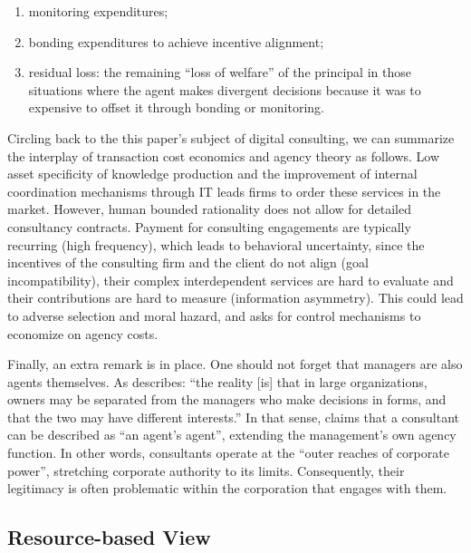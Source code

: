 \documentclass[12pt]{article}
\providecommand{\tightlist}{%
  \setlength{\itemsep}{0pt}\setlength{\parskip}{0pt}}
\begin{document}
\begin{enumerate}
\def\labelenumi{\arabic{enumi}.}
\tightlist
\item
  monitoring expenditures;
\item
  bonding expenditures to achieve incentive alignment;
\item
  residual loss: the remaining ``loss of welfare'' of the principal in
  those situations where the agent makes divergent decisions because it
  was to expensive to offset it through bonding or monitoring.
\end{enumerate}

Circling back to the this paper's subject of digital consulting, we can
summarize the interplay of transaction cost economics and agency theory
as follows. Low asset specificity of knowledge production and the
improvement of internal coordination mechanisms through IT leads firms
to order these services in the market. However, human bounded
rationality does not allow for detailed consultancy contracts. Payment
for consulting engagements are typically recurring (high frequency),
which leads to behavioral uncertainty, since the incentives of the
consulting firm and the client do not align (goal incompatibility),
their complex interdependent services are hard to evaluate and their
contributions are hard to measure (information asymmetry). This could
lead to adverse selection and moral hazard, and asks for control
mechanisms to economize on agency costs.

Finally, an extra remark is in place. One should not forget that
managers are also agents themselves. As \citet[584]{tosi1997} describes:
``the reality {[}is{]} that in large organizations, owners may be
separated from the managers who make decisions in forms, and that the
two may have different interests.'' In that sense, \citet{fincham2002}
claims that a consultant can be described as ``an agent's agent'',
extending the management's own agency function. In other words,
consultants operate at the ``outer reaches of corporate power'',
stretching corporate authority to its limits. Consequently, their
legitimacy is often problematic within the corporation that engages with
them.

\subsection{Resource-based View}\label{resource-based-view}
\end{document}
